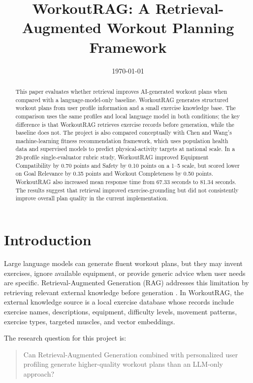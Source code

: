 \documentclass[12pt]{article}
\title{WorkoutRAG: A Retrieval-Augmented Workout Planning Framework}
\author{\todo{Add author name, course, instructor, and institution}}
\date{\today}
\begin{document}
\maketitle

\begin{abstract}
This paper evaluates whether retrieval improves AI-generated workout plans when compared with a language-model-only baseline. WorkoutRAG generates structured workout plans from user profile information and a small exercise knowledge base. The comparison uses the same profiles and local language model in both conditions; the key difference is that WorkoutRAG retrieves exercise records before generation, while the baseline does not. The project is also compared conceptually with Chen and Wang's machine-learning fitness recommendation framework, which uses population health data and supervised models to predict physical-activity targets at national scale. In a 20-profile single-evaluator rubric study, WorkoutRAG improved Equipment Compatibility by 0.70 points and Safety by 0.10 points on a 1--5 scale, but scored lower on Goal Relevance by 0.35 points and Workout Completeness by 0.50 points. WorkoutRAG also increased mean response time from 67.33 seconds to 81.34 seconds. The results suggest that retrieval improved exercise-grounding but did not consistently improve overall plan quality in the current implementation.
\end{abstract}

\section{Introduction}
Large language models can generate fluent workout plans, but they may invent exercises, ignore available equipment, or provide generic advice when user needs are specific. Retrieval-Augmented Generation (RAG) addresses this limitation by retrieving relevant external knowledge before generation \cite{lewis2020retrieval}. In WorkoutRAG, the external knowledge source is a local exercise database whose records include exercise names, descriptions, equipment, difficulty levels, movement patterns, exercise types, targeted muscles, and vector embeddings.

The research question for this project is:
\begin{quote}
Can Retrieval-Augmented Generation combined with personalized user profiling generate higher-quality workout plans than an LLM-only approach?
\end{quote}
\end{document}
